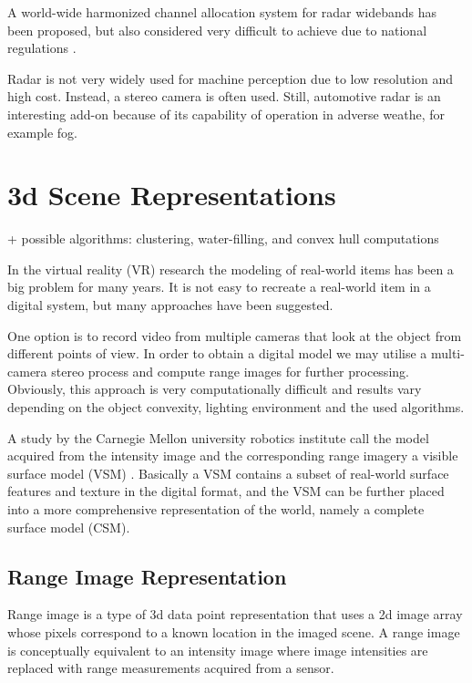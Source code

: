 \documentclass[12pt,a4paper,oneside,pdftex]{report}
\begin{document}
A world-wide harmonized channel allocation system for radar widebands has been proposed, but also considered very difficult to achieve due to national regulations \cite{Wenger07}.

Radar is not very widely used for machine perception due to low resolution and high cost. Instead, a stereo camera is often used. Still, automotive radar is an interesting add-on because of its capability of operation in adverse weathe, for example fog. 


\section{3d Scene Representations}
\label{section:3d_scene_representations}
+ possible algorithms: clustering, water-filling, and convex hull computations

In the virtual reality (VR) research the modeling of real-world items has been a big problem for many years. 
It is not easy to recreate a real-world item in a digital system, but many approaches have been suggested.

One option is to record video from multiple cameras that look at the object from different points of view. In order to obtain a digital model we may utilise a multi-camera stereo process and compute range images for further processing. Obviously, this approach is very computationally difficult and results vary depending on the object convexity, lighting environment and the used algorithms.  

A study by the Carnegie Mellon university robotics institute call the model acquired from the intensity image and the corresponding range imagery a visible surface model (VSM) \cite{Rander97}. Basically a VSM contains a subset of real-world surface features and texture in the digital format, and the VSM can be further placed into a more comprehensive representation of the world, namely a complete surface model (CSM). 

\subsection{Range Image Representation}
\label{subsection:range_image_representation}

Range image is a type of 3d data point representation that uses a 2d image array whose pixels correspond to a known location in the imaged scene. A range image is conceptually equivalent to an intensity image where image intensities are replaced with range measurements acquired from a sensor.
\end{document}
